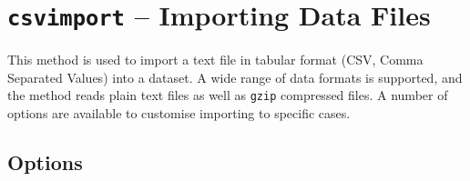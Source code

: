 
\section{\texttt{csvimport} -- Importing Data Files}

This method is used to import a text file in tabular format (CSV,
Comma Separated Values) into a dataset.  A wide range of data formats
is supported, and the method reads plain text files as well as
\texttt{gzip} compressed files.  A number of options are available to
customise importing to specific cases.


\subsection{Options}


